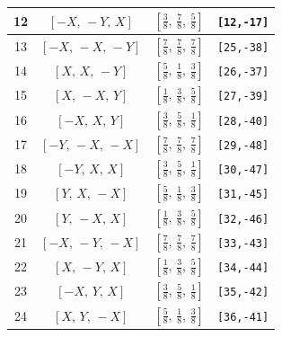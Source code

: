 \documentclass[fleqn,8pt]{jsarticle}
\begin{document}
\begin{longtable}{cccc}
12 & $\left[ - X,\, - Y,\, X \right]$ & $\left[ \frac{3}{8},\, \frac{7}{8},\, \frac{5}{8} \right]$ & {\tt [12,-17]} \\ \hline
13 & $\left[ - X,\, - X,\, - Y \right]$ & $\left[ \frac{7}{8},\, \frac{7}{8},\, \frac{7}{8} \right]$ & {\tt [25,-38]} \\ \hline
14 & $\left[ X,\, X,\, - Y \right]$ & $\left[ \frac{5}{8},\, \frac{1}{8},\, \frac{3}{8} \right]$ & {\tt [26,-37]} \\ \hline
15 & $\left[ X,\, - X,\, Y \right]$ & $\left[ \frac{1}{8},\, \frac{3}{8},\, \frac{5}{8} \right]$ & {\tt [27,-39]} \\ \hline
16 & $\left[ - X,\, X,\, Y \right]$ & $\left[ \frac{3}{8},\, \frac{5}{8},\, \frac{1}{8} \right]$ & {\tt [28,-40]} \\ \hline
17 & $\left[ - Y,\, - X,\, - X \right]$ & $\left[ \frac{7}{8},\, \frac{7}{8},\, \frac{7}{8} \right]$ & {\tt [29,-48]} \\ \hline
18 & $\left[ - Y,\, X,\, X \right]$ & $\left[ \frac{3}{8},\, \frac{5}{8},\, \frac{1}{8} \right]$ & {\tt [30,-47]} \\ \hline
19 & $\left[ Y,\, X,\, - X \right]$ & $\left[ \frac{5}{8},\, \frac{1}{8},\, \frac{3}{8} \right]$ & {\tt [31,-45]} \\ \hline
20 & $\left[ Y,\, - X,\, X \right]$ & $\left[ \frac{1}{8},\, \frac{3}{8},\, \frac{5}{8} \right]$ & {\tt [32,-46]} \\ \hline
21 & $\left[ - X,\, - Y,\, - X \right]$ & $\left[ \frac{7}{8},\, \frac{7}{8},\, \frac{7}{8} \right]$ & {\tt [33,-43]} \\ \hline
22 & $\left[ X,\, - Y,\, X \right]$ & $\left[ \frac{1}{8},\, \frac{3}{8},\, \frac{5}{8} \right]$ & {\tt [34,-44]} \\ \hline
23 & $\left[ - X,\, Y,\, X \right]$ & $\left[ \frac{3}{8},\, \frac{5}{8},\, \frac{1}{8} \right]$ & {\tt [35,-42]} \\ \hline
24 & $\left[ X,\, Y,\, - X \right]$ & $\left[ \frac{5}{8},\, \frac{1}{8},\, \frac{3}{8} \right]$ & {\tt [36,-41]} \\
\end{longtable}
\renewcommand{\arraystretch}{1.2}
\end{document}
